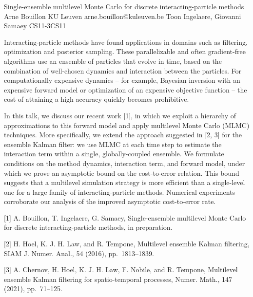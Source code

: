 \begin{talk}
  {Single-ensemble multilevel Monte Carlo for discrete interacting-particle methods}%
  {Arne Bouillon}%
  {KU Leuven}%
  {arne.bouillon@kuleuven.be}%
  {Toon Ingelaere, Giovanni Samaey}%
{}{}{CS11-3}{CS11}


Interacting-particle methods have found applications in domains such as filtering, optimization and posterior sampling. These parallelizable and often gradient-free algorithms use an ensemble of particles that evolve in time, based on the combination of well-chosen dynamics and interaction between the particles. For computationally expensive dynamics -- for example, Bayesian inversion with an expensive forward model or optimization of an expensive objective function -- the cost of attaining a high accuracy quickly becomes prohibitive.

In this talk, we discuss our recent work [1], in which we exploit a hierarchy of approximations to this forward model and apply multilevel Monte Carlo (MLMC) techniques. More specifically, we extend the approach suggested in [2, 3] for the ensemble Kalman filter: we use MLMC at each time step to estimate the interaction term within a single, globally-coupled ensemble. We formulate conditions on the method dynamics, interaction term, and forward model, under which we prove an asymptotic bound on the cost-to-error relation. This bound suggests that a multilevel simulation strategy is more efficient than a single-level one for a large family of interacting-particle methods. Numerical experiments corroborate our analysis of the improved asymptotic cost-to-error rate.

\medskip

[1] A. Bouillon, T. Ingelaere, G. Samaey, Single-ensemble multilevel Monte Carlo for discrete interacting-particle methods, in preparation.

[2] H. Hoel, K. J. H. Law, and R. Tempone, Multilevel ensemble Kalman filtering, SIAM J. Numer. Anal., 54 (2016), pp.\ 1813--1839.

[3] A. Chernov, H. Hoel, K. J. H. Law, F. Nobile, and R. Tempone, Multilevel ensemble Kalman filtering for spatio-temporal processes, Numer. Math., 147 (2021), pp.\ 71--125.
\end{talk}